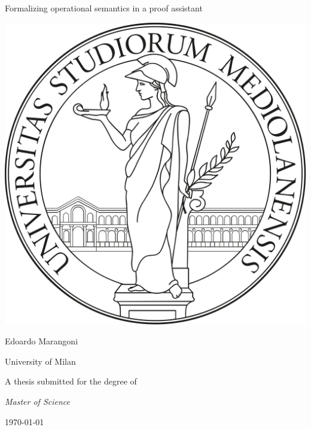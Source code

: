 \begin{titlepage}
	\centering
	\vfill
	\vspace*{2cm}
	\Huge{Formalizing operational semantics in a proof assistant}

	\vspace*{2.5cm}

	\includegraphics[scale=0.07]{figures/Minerva.png}

	\vspace*{2.5cm}

	\Large{Edoardo Marangoni}

	\large{University of Milan}

	\vspace*{2cm}
	\large{A thesis submitted for the degree of}

	 \large{\textit{Master of Science}}
	\vspace*{2cm}

	\small{\today}
	\vspace*{2cm}
	\vfill
\end{titlepage}
